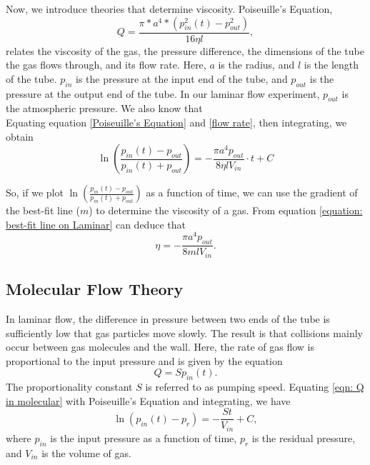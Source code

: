 \documentclass[12pt,a4paper]{article}
\begin{document}
		Now, we introduce theories that determine viscosity.
		Poiseuille's Equation,\\
			\begin{equation}
				Q=\frac{\pi*a^4*(p_{in}^2(t)-p_{out}^2)}{16 \eta l},
				\label{Poiseuille's Equation}
			\end{equation}
		relates the viscosity of the gas, the pressure difference, the dimensions of the tube the gas flows through, and its flow rate. Here, $a$ is the radius, and $l$ is the length of the tube. $p_{in}$ is the pressure at the input end of the tube, and $p_{out}$ is the pressure at the output end of the tube. In our laminar flow experiment, $p_{out}$ is the atmospheric pressure. We also know that\\
		\begin{equation}
			\label{flow rate}
		\end{equation}
	Equating equation \ref{Poiseuille's Equation} and \ref{flow rate}, then integrating, we obtain\\
		\begin{equation}
			\ln (\frac{p_{in}(t)-p_{out}}{p_{in}(t)+p_{out}})=-\frac{\pi a^4 p_{out}}{8 \eta l V_{in}} \cdot t+C
			\label{equation: best-fit line on Laminar}
		\end{equation}	
	
	So, if we plot $\ln (\frac{p_{in}(t)-p_{out}}{p_{in}(t)+p_{out}})$ as a function of time, we can use the gradient of the best-fit line ($m$) to determine the viscosity of a gas. From equation \ref{equation: best-fit line on Laminar} can deduce that\\
	\begin{equation}
		\eta=-\frac{\pi a^4 p_{out}}{8 m l V_{in}}. 
		\label{eq: viscosity}
	\end{equation}
	\subsection{Molecular Flow Theory}
	In laminar flow, the difference in pressure between two ends of the tube is sufficiently low that gas particles move slowly. The result is that collisions mainly occur between gas molecules and the wall. Here, the rate of gas flow is proportional to the input pressure and is given by the equation\\
	\begin{equation}
		Q=S p_{in}(t). \label{eqn: Q in molecular}
	\end{equation} 
	The proportionality constant $S$ is referred to as pumping speed.
	Equating \ref{eqn: Q in molecular} with Poiseuille's Equation and integrating, we have\\
	\begin{equation}
		\ln (p_{in}(t)-p_r)=-\frac{St}{V_{in}}+C,\label{eqn: Molecular best fit}
	\end{equation}
	where $p_{in}$ is the input pressure as a function of time, $p_r$ is the residual pressure, and $V_{in}$ is the volume of gas.\cite{Lab_Instruction}
\end{document}
